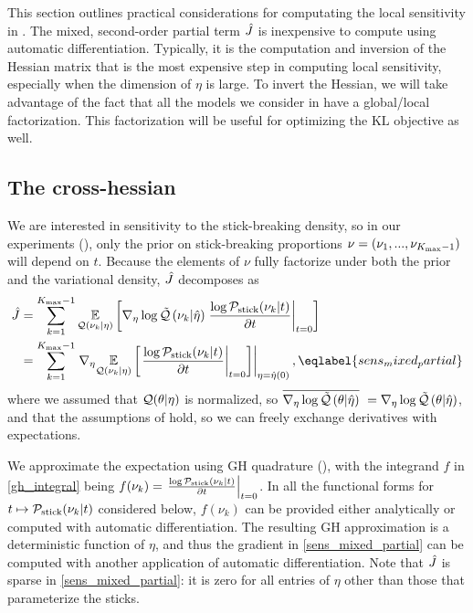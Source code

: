 
This section outlines practical considerations for computating
the local sensitivity in .
The mixed, second-order partial term $\hat J$
is inexpensive to compute using automatic differentiation.
Typically, it is the computation and inversion of the Hessian matrix that is
the most expensive step in computing local sensitivity,
especially when the dimension of $\eta$ is large.
To invert the Hessian, we will take advantage of the fact that
all the models we consider in  have a global/local factorization.
This factorization will be useful for optimizing the $\mathrm{KL}$ objective
as well.

\subsection{The cross-hessian}


We are interested in sensitivity to the stick-breaking density,
so in our experiments (),
only the prior on stick-breaking proportions
$\nu = (\nu_1, ..., \nu_{{K_{\mathrm{max}}} - 1})$ will depend on $t$.
Because the elements of $\nu$ fully factorize
under both the prior and the variational density,
$\hat J$ decomposes as
\begin{align}
  \crosshessian &=
  \sum_{\k=1}^{\kmax - 1}
          \expect{\q(\nuk \vert \eta)}
                 {
                 \lqgrad{\nuk \vert \etaopt}
                 \fracat{\log \pstick(\nuk \vert \t)}{\partial \t}{\t = 0}
                 } \notag\\
  &= \sum_{\k=1}^{\kmax - 1}
         \evalat{\nabla_\eta \expect{\q(\nuk \vert \eta)}
                {
                \fracat{\log \pstick(\nuk \vert \t)}{\partial \t}{\t = 0}
                }}{\eta = \etaopt(0)},
\eqlabel{sens_mixed_partial}
\end{align}
where we assumed that $\mathcal{Q}(\theta \vert \eta)$ is normalized, so
$\overline{{\nabla_\eta \log \tilde{\mathcal{Q}}}\left(\theta \vert \hat\eta\right)}\,\, = {\nabla_\eta \log \tilde{\mathcal{Q}}}\left(\theta \vert \hat\eta\right)$,
and that the assumptions of  hold, so we
can freely exchange derivatives with expectations.

We approximate the expectation using GH quadrature (),
with the integrand $f$ in \eqref{gh_integral} being
$f(\nu_k) = \left.\frac{\log \mathcal{P}_{\mathrm{stick}}(\nu_{k} \vert t)}{\partial t}\right\vert_{t = 0}$.
In all the functional forms for
$t \mapsto \mathcal{P}_{\mathrm{stick}}(\nu_{k} \vert t)$ considered below,
$f(\nu_k)$ can be provided either analytically or computed with automatic differentiation.
The resulting GH approximation is a deterministic function of $\eta$,
and thus the gradient in \eqref{sens_mixed_partial} can be computed
with another application of automatic differentiation.
Note that $\hat J$ is sparse in \eqref{sens_mixed_partial}:
it is zero for all entries of
$\eta$ other than those that parameterize the sticks.

